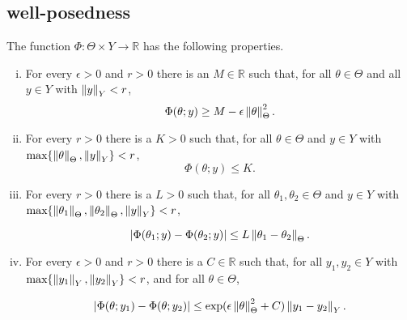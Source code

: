\subsection{well-posedness}

\begin{assumption}\label{assumption-ll}
  The function $\Phi : \Theta \times Y \rightarrow \mathbb{R}$ has the following properties.
  
  \begin{enumerate}[i)]
  \item For every $\epsilon > 0$ and $r > 0$ there is an $M \in \mathbb{R}$ such that, for all $\theta \in \Theta$ and all $y \in Y$ with $\left\lVert y\right\rVert_Y < r$,
    \begin{equation*}
      \Phi(\theta; y) \ge M - \epsilon\left\lVert\theta\right\rVert_\Theta^2.
    \end{equation*}
  \item For every $r > 0$ there is a $K > 0$ such that, for all $\theta \in \Theta$ and $y \in Y$ with $\text{max}\{\left\lVert\theta\right\rVert_\Theta, \left\lVert y\right\rVert_Y\} < r$,
    \begin{equation*}
      \Phi(\theta; y) \le K.
    \end{equation*}

  \item For every $r > 0$ there is a $L > 0$ such that, for all $\theta_1, \theta_2 \in \Theta$ and $y \in Y$ with $\text{max}\{\left\lVert\theta_1\right\rVert_\Theta, \left\lVert\theta_2\right\rVert_\Theta, \left\lVert y\right\rVert_Y\} < r$,

    \begin{equation*}
      |\Phi(\theta_1; y) - \Phi(\theta_2; y)| \le L\left\lVert\theta_1 - \theta_2\right\rVert_\Theta.
    \end{equation*}

  \item For every $\epsilon > 0$ and $r > 0$ there is a $C \in \mathbb{R}$ such that, for all $y_1, y_2 \in Y$ with $\text{max}\{\left\lVert y_1\right\rVert_Y, \left\lVert y_2\right\rVert_Y\} < r$, and for all $\theta \in \Theta$,

    \begin{equation*}
      |\Phi(\theta; y_1) - \Phi(\theta; y_2)| \le \exp(\epsilon\left\lVert\theta\right\rVert_\Theta^2 + C)\left\lVert y_1 - y_2\right\rVert_Y.
    \end{equation*}
  \end{enumerate}
\end{assumption}

